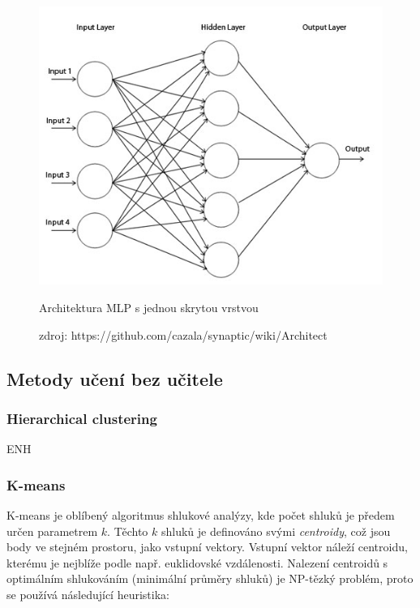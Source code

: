 \documentclass[thesis=M,czech]{FITthesis}[2012/06/26]
\begin{document}
\begin{figure}[htbp]
\begin{center}
	\includegraphics[scale=0.4]{mlp.jpeg}
\caption{Architektura MLP s jednou skrytou vrstvou}
\label{fig:mlp}
\end{center}
  \caption*{zdroj: https://github.com/cazala/synaptic/wiki/Architect}
\end{figure}

 
 \subsection{Metody učení bez učitele}
  \subsubsection*{Hierarchical clustering}
  ENH
  \subsubsection*{K-means}

K-means je oblíbený algoritmus shlukové analýzy, kde počet shluků je předem určen parametrem $k$. Těchto $k$ shluků je definováno svými \textit{centroidy}, což jsou body ve stejném prostoru, jako vstupní vektory. Vstupní vektor náleží centroidu, kterému je nejblíže podle např. euklidovské vzdálenosti. Nalezení centroidů s optimálním shlukováním (minimální průměry shluků) je NP-tězký problém\cite{k-means-nphard}, proto se  používá následující heuristika\cite{k-means-algo}:
\end{document}
